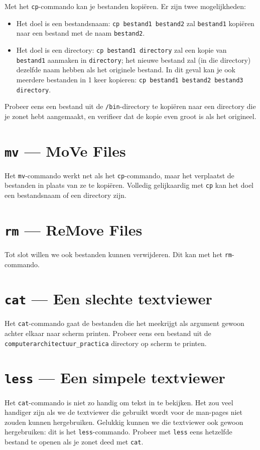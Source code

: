 \documentclass[a4paper,twoside,openany]{memoir}
\begin{document}
Met het \verb!cp!-commando kan je bestanden kopiëren. Er zijn twee mogelijkheden:

\begin{itemize}

  \item Het doel is een bestandsnaam: \verb!cp bestand1 bestand2! zal
    \verb!bestand1! kopiëren naar een bestand met de naam \verb!bestand2!.

  \item Het doel is een directory: \verb!cp bestand1 directory! zal een kopie
    van \verb!bestand1! aanmaken in \verb!directory!; het nieuwe bestand zal (in
    die directory) dezelfde naam hebben als het originele bestand. In dit geval
    kan je ook meerdere bestanden in 1 keer kopieren: \verb!cp bestand1 bestand2 bestand3 directory!.

\end{itemize}

Probeer eens een bestand uit de \verb!/bin!-directory te kopiëren naar een
directory die je zonet hebt aangemaakt, en verifieer dat de kopie even groot is
als het origineel.

\section{\texttt{mv} --- MoVe Files}

Het \verb!mv!-commando werkt net als het \verb!cp!-commando, maar het verplaatst
de bestanden in plaats van ze te kopiëren. Volledig gelijkaardig met \verb!cp!
kan het doel een bestandsnaam of een directory zijn.

\section{\texttt{rm} --- ReMove Files}

Tot slot willen we ook bestanden kunnen verwijderen. Dit kan met het
\verb!rm!-commando.

\section{\texttt{cat} --- Een slechte textviewer}
Het \verb!cat!-commando gaat de bestanden die het meekrijgt als argument gewoon achter elkaar naar scherm printen. Probeer eens een bestand uit de \verb!computerarchitectuur_practica! directory op scherm te printen.

\section{\texttt{less} --- Een simpele textviewer}
Het \verb!cat!-commando is niet zo handig om tekst in te bekijken. Het zou veel handiger zijn als we de textviewer die gebruikt wordt voor de man-pages niet zouden kunnen hergebruiken. Gelukkig kunnen we die textviewer ook gewoon hergebruiken: dit is het \verb!less!-commando. Probeer met \verb!less! eens hetzelfde bestand te openen als je zonet deed met \verb!cat!.
\end{document}
